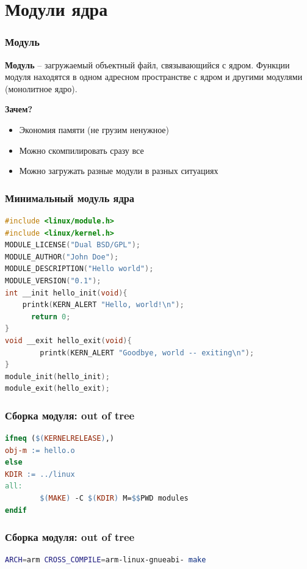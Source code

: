 \section{Модули ядра}
\begin{frame}
  \frametitle{Модуль}
\textbf{Модуль} -- загружаемый объектный файл, связывающийся с ядром.
\vspace{1cm}
Функции модуля находятся в одном адресном пространстве с ядром и другими модулями (монолитное ядро).
\vspace{0.5cm}
\begin{center}
  \textbf{Зачем?}
\end{center}
\begin{itemize}
  \item Экономия памяти (не грузим ненужное)
  \item Можно скомпилировать сразу все
  \item Можно загружать разные модули в разных ситуациях
\end{itemize}
\end{frame}
\begin{frame}[fragile]
  \frametitle{Минимальный модуль ядра}
\begin{lstlisting}[language=C]
#include <linux/module.h>
#include <linux/kernel.h>
MODULE_LICENSE("Dual BSD/GPL");
MODULE_AUTHOR("John Doe");
MODULE_DESCRIPTION("Hello world");
MODULE_VERSION("0.1");
int __init hello_init(void){
    printk(KERN_ALERT "Hello, world!\n");
      return 0;
}
void __exit hello_exit(void){
        printk(KERN_ALERT "Goodbye, world -- exiting\n");
}
module_init(hello_init);
module_exit(hello_exit);
\end{lstlisting}
\end{frame}

\begin{frame}[fragile]
  \frametitle{Сборка модуля: out of tree}
\begin{lstlisting}[language=make]
ifneq ($(KERNELRELEASE),)
obj-m := hello.o
else
KDIR := ../linux
all:
        $(MAKE) -C $(KDIR) M=$$PWD modules
endif
\end{lstlisting}
\end{frame}

\begin{frame}[fragile]
  \frametitle{Сборка модуля: out of tree}
\begin{lstlisting}[language=bash]
ARCH=arm CROSS_COMPILE=arm-linux-gnueabi- make
\end{lstlisting}
\end{frame}

